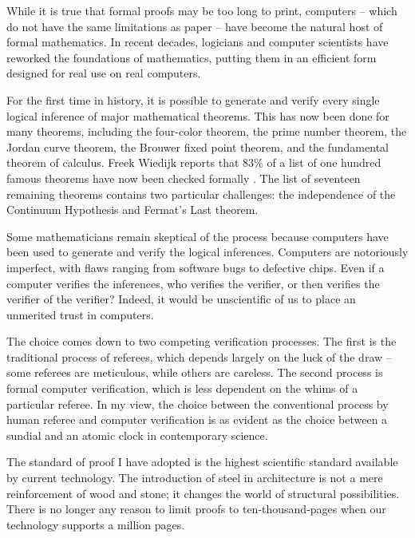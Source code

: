 While it is true that formal proofs may be too long to print,
computers -- which do not have the same limitations as paper -- have
become the natural host of formal mathematics. In recent decades,
logicians and computer scientists have reworked the foundations of
mathematics, putting them in an efficient form designed for real use
on real computers.

For the first time in history, it is possible to generate and verify
every single logical inference of major mathematical theorems.  This
has now been done for many theorems, including the four-color theorem, the prime number
theorem, the Jordan curve theorem, the Brouwer fixed point theorem,
and the fundamental theorem of calculus.  Freek Wiedijk
reports that 83\% of a list of one hundred famous theorems have now been
checked formally \cite{wiedijk:100}.  The list of seventeen remaining
theorems contains two particular challenges: the independence of the
Continuum Hypothesis and Fermat's Last theorem.

Some mathematicians remain skeptical of the process because computers
have been used to generate and verify the logical inferences.
Computers are notoriously imperfect, with flaws ranging from software
bugs to defective chips.  Even if a computer verifies the inferences,
who  verifies the verifier, or then verifies the verifier of the
verifier?  Indeed, it would be unscientific of us to place an
unmerited trust in computers.

The choice comes down to two competing verification processes.  The
first is the traditional process of referees, which depends largely on
the luck of the draw -- some referees are meticulous, while others are
careless.  The second process is formal computer verification, which
is less dependent on the whims of a particular referee.  In my view,
the choice between the conventional  process by human referee and computer
verification is as evident as the choice between a sundial and an atomic
clock in contemporary science.

The standard of proof I have adopted is the highest scientific
standard available by current technology.  
The introduction of steel in
architecture is not a mere reinforcement of wood and stone; it changes
the world of structural possibilities.  There is no longer any
reason to limit proofs to ten-thousand-pages when our
technology supports a million pages.

